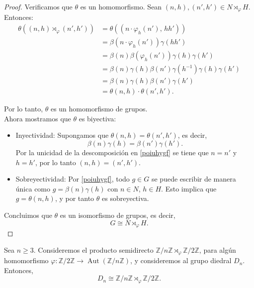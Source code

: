 \begin{proof}
	\smallskip
	\noindent
	Verificamos que $\theta$ es un homomorfismo. Sean $(n, h), (n', h') \in N \rtimes_{\varphi} H$. Entonces:
	\begin{align*}
		\theta\left( (n,h)\rtimes_\varphi (n',h') \right) 
		&= \theta\left( \left( n \cdot \varphi_h(n'),\, hh' \right) \right) \\[4pt]
		&= \beta\left( n \cdot \varphi_h(n') \right)\gamma(hh') \\[4pt]
		&= \beta(n)\beta\left( \varphi_h(n') \right)\gamma(h)\gamma(h') \\[4pt]
		&= \beta(n)\gamma(h)\beta(n')\gamma(h^{-1})\gamma(h)\gamma(h') \\[4pt]
		&= \beta(n)\gamma(h)\beta(n')\gamma(h') \\[4pt]
		&= \theta(n,h)\cdot\theta(n',h').
	\end{align*}
	
	\noindent
	Por lo tanto, $\theta$ es un homomorfismo de grupos.\\
	
	\noindent
	Ahora mostramos que $\theta$ es biyectiva:    
	\begin{itemize}
		\item Inyectividad: Supongamos que $\theta(n,h) = \theta(n',h')$, es decir,
		\[
		\beta(n)\gamma(h) = \beta(n')\gamma(h').
		\]
		Por la unicidad de la descomposición en \eqref{poiuhygf} se tiene que $n = n'$ y $h = h'$, por lo tanto $(n,h) = (n',h')$.
		
		\item Sobreyectividad: Por \eqref{poiuhygf}, todo $g \in G$ se puede escribir de manera única como $g = \beta(n)\gamma(h)$ con $n \in N$, $h \in H$. Esto implica que $g = \theta(n,h)$, y por tanto $\theta$ es sobreyectiva.
	\end{itemize}
	
	\noindent
	Concluimos que $\theta$ es un isomorfismo de grupos, es decir,
	\[
	G \cong N \rtimes_{\varphi} H.
	\]
\end{proof}


\begin{proposicion}\label{ñlkjhgfhjk}
	\upshape
	Sea \( n \geq 3 \). Consideremos el producto semidirecto \( \mathbb{Z}/n\mathbb{Z} \rtimes_{\varphi} \mathbb{Z}/2\mathbb{Z} \), para algún homomorfismo \( \varphi: \mathbb{Z}/2\mathbb{Z} \to \operatorname{Aut}(\mathbb{Z}/n\mathbb{Z}) \), y consideremos al grupo diedral $D_n$. Entonces,
	\[
	D_n \cong \mathbb{Z}/n\mathbb{Z} \rtimes_{\varphi} \mathbb{Z}/2\mathbb{Z}.
	\]
\end{proposicion}



